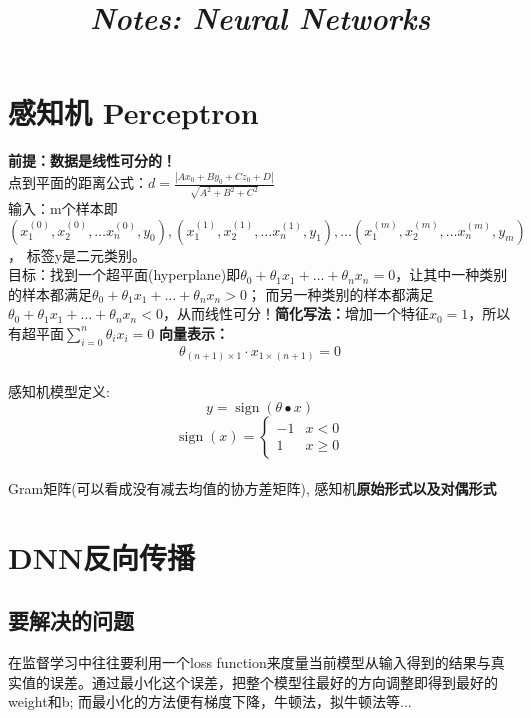 \documentclass[UTF8]{article}
\title{
    \begin{center}{\Huge \textit{Notes: Neural Networks}}
    \end{center}}
\begin{document}
    \maketitle
    \tableofcontents

    \newpage


    \section{感知机 Perceptron}
    \textbf{前提：数据是线性可分的！}\\
    点到平面的距离公式：$d=\frac{\left|A x_{0}+B y_{0}+C z_{0}+D\right|}{\sqrt{A^{2}+B^{2}+C^{2}}}$
    \\
    输入：m个样本即$\left(x_{1}^{(0)}, x_{2}^{(0)}, \ldots x_{n}^{(0)}, y_{0}\right),\left(x_{1}^{(1)}, x_{2}^{(1)}, \ldots x_{n}^{(1)}, y_{1}\right), \ldots\left(x_{1}^{(m)}, x_{2}^{(m)}, \ldots x_{n}^{(m)}, y_{m}\right)$，
    标签y是二元类别。
    \\
    目标：找到一个超平面(hyperplane)即$\theta_{0}+\theta_{1} x_{1}+\ldots+\theta_{n} x_{n}=0$，让其中一种类别的样本都满足$\theta_{0}+\theta_{1} x_{1}+\ldots+\theta_{n} x_{n}>0$；
    而另一种类别的样本都满足$\theta_{0}+\theta_{1} x_{1}+\ldots+\theta_{n} x_{n}<0$，从而线性可分！\textbf{简化写法：}增加一个特征$x_0=1$，所以有超平面$\sum_{i=0}^{n} \theta_{i} x_{i}=0$
    \textbf{向量表示：}$$\theta_{(n+1) \times 1} \cdot x_{1 \times (n+1)}= 0$$
    \\
    感知机模型定义: $$y=\operatorname{sign}(\theta \bullet x)$$
    $$\operatorname{sign}(x)=\left\{\begin{array}{ll}{-1} & {x<0} \\ {1} & {x \geq 0}\end{array}\right.$$
    \\
    Gram矩阵(可以看成没有减去均值的协方差矩阵), 感知机\textbf{原始形式以及对偶形式}

    \section{DNN反向传播}
    \subsection{要解决的问题}
    在监督学习中往往要利用一个loss function来度量当前模型从输入得到的结果与真实值的误差。通过最小化这个误差，把整个模型往最好的方向调整即得到最好的weight和b;
    而最小化的方法便有梯度下降，牛顿法，拟牛顿法等...
\end{document}
